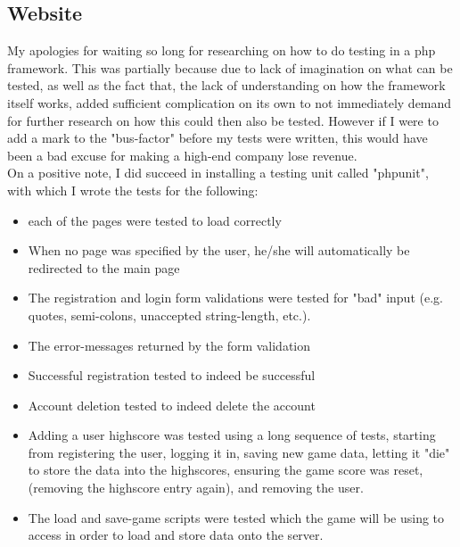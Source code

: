 \documentclass[12pt]{report}
\begin{document}
\subsection*{Website}
My apologies for waiting so long for researching on how to do testing in a php framework. This was partially because due to lack of imagination on what can be tested, as well as the fact that, the lack of understanding on how the framework itself works, added sufficient complication on its own to not immediately demand for further research on how this could then also be tested. However if I were to add a mark to the "bus-factor" before my tests were written, this would have been a bad excuse for making a high-end company lose revenue.\\
On a positive note, I did succeed in installing a testing unit called "phpunit", with which I wrote the tests for the following:
\begin{itemize}
\item each of the pages were tested to load correctly
\item When no page was specified by the user, he/she will automatically be redirected to the main page
\item The registration and login form validations were tested for "bad" input (e.g. quotes, semi-colons, unaccepted string-length, etc.).
\item The error-messages returned by the form validation
\item Successful registration tested to indeed be successful
\item Account deletion tested to indeed delete the account
\item Adding a user highscore was tested using a long sequence of tests, starting from registering the user, logging it in, saving new game data, letting it "die" to store the data into the highscores, ensuring the game score was reset, (removing the highscore entry again), and removing the user.
\item The load and save-game scripts were tested which the game will be using to access in order to load and store data onto the server.
\end{itemize}
\end{document}
